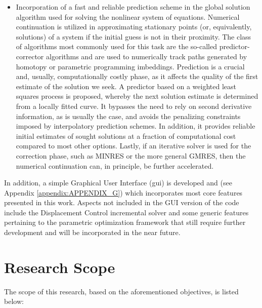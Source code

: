 \begin{itemize}
	\item Incorporation of a fast and reliable prediction scheme in the global 
	solution 
	algorithm used for solving the nonlinear system of equations. Numerical 
	continuation is utilized in approximating stationary points (or, equivalently, 
	solutions) of a system if the initial guess is not in their proximity. The class 
	of algorithms most commonly used for this task are the so-called 
	predictor-corrector algorithms and are used to numerically track paths generated 
	by homotopy or parametric programming imbeddings. Prediction is a crucial and, 
	usually, computationally costly phase, as it affects the quality of the first 
	estimate of the solution we seek. A predictor based on a weighted least squares 
	process is proposed, whereby the next solution estimate is determined from a 
	locally fitted curve. It bypasses the need to rely on second derivative 
	information, as is usually the case, and avoids the penalizing constraints 
	imposed 
	by interpolatory prediction schemes. In addition, it provides reliable initial 
	estimates of sought solutions at a fraction of computational cost compared to most 
	other options. Lastly, if an iterative solver is used for the correction 
	phase, such as MINRES\cite{paige1975solution} or the more general 
	GMRES\cite{saad1986gmres}, then 
	the numerical 
	continuation can, in principle, be further accelerated.
	
\end{itemize}

In addition, a simple Graphical User Interface (\acrshort{gui}) is developed 
and (see Appendix \ref{appendix:APPENDIX_G}) which incorporates most core 
features presented in this work. Aspects not included in the GUI version of the 
code include the Displacement Control incremental solver and some generic 
features pertaining to the parametric optimization framework that still require 
further development and will be incorporated in the near future.

\section{Research Scope}
The scope of this research, based on the aforementioned objectives, is listed below:

